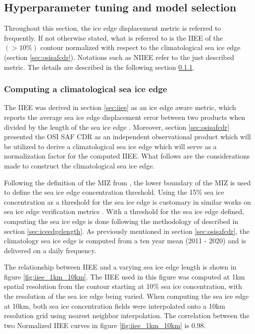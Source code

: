 \documentclass[../main/thesis]{subfiles}
\begin{document}
\subsection{Hyperparameter tuning and model selection}
\label{sec:model_development_results}
Throughout this section, the ice edge displacement metric is referred to frequently. If not otherwise stated, what is referred to is the IIEE of the $(> 10\%)$ contour normalized with respect to the climatological sea ice edge (section \ref{sec:osisafcdr}). Notations such as NIIEE refer to the just described metric. The details are described in the following section \ref{sec:clim_iceedge_compute}.

\subsubsection{Computing a climatological sea ice edge}
\label{sec:clim_iceedge_compute}
The IIEE \citep{Goessling2016} was derived in section \ref{sec:iiee} as an ice edge aware metric, which reports the average sea ice edge displacement error between two products when divided by the length of the sea ice edge \citep{Melsom2019}. Moreover, section \ref{sec:osisafcdr} presented the OSI SAF CDR as an independent observational product which will be utilized to derive a climatological sea ice edge which will serve as a normalization factor for the computed IIEE. What follows are the considerations made to construct the climatological sea ice edge.

Following the definition of the MIZ from \citet{Strong2012}, the lower boundary of the MIZ is used to define the sea ice edge concentration threshold. Using the 15\% sea ice concentration as a threshold for the sea ice edge is customary in similar works on sea ice edge verification metrics \citep{Dukhovskoy2015,Goessling2016,Goessling2018,Melsom2019}. With a threshold for the sea ice edge defined, computing the sea ice edge is done following the methodology of \citet{Melsom2019} described in section \ref{sec:iceedgelength}. As previously mentioned in section \ref{sec:osisafcdr}, the climatology sea ice edge is computed from a ten year mean (2011 - 2020) and is delivered on a daily frequency.

The relationship between IIEE and a varying sea ice edge length is shown in figure \ref{fig:iiee_1km_10km}. The IIEE used in this figure was computed at 1km spatial resolution from the contour starting at 10\% sea ice concentration, with the resolution of the sea ice edge being varied. When computing the sea ice edge at 10km, both sea ice concentration fields were interpolated onto a 10km resolution grid using nearest neighbor interpolation. The correlation between the two Normalized IIEE curves in figure \ref{fig:iiee_1km_10km} is 0.98.
\end{document}
